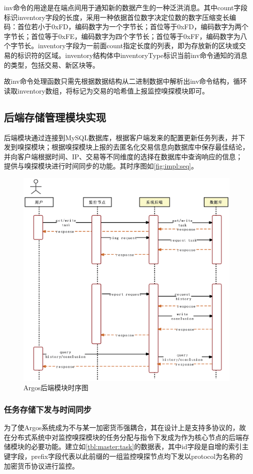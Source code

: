 \documentclass[supercite]{HustGraduPaper}
\newcommand{\xfig}[3]{
  \begin{figure}[htb]
    \centering
    #3
    \caption{#2}
    \label{fig:#1}
  \end{figure}
}
\newcommand{\rfig}[1]{\autoref{fig:#1}}
\newcommand{\rtbl}[1]{\autoref{tbl:#1}}
\theoremstyle{definition}
\begin{document}
inv命令的用途是在端点间用于通知新的数据产生的一种泛洪消息。其中count字段标识inventory字段的长度，采用一种依据首位数字决定位数的数字压缩变长编码：首位若小于0xFD，编码数字为一个字节长；首位等于0xFD，编码数字为两个字节长；首位等于0xFE，编码数字为四个字节长；首位等于0xFF，编码数字为八个字节长。inventory字段为一前面count指定长度的列表，即为存放新的区块或交易的标识符的区域。inventory结构体中inventoryType标识当前inv命令通知的消息的类型，包括交易、新区块等。

故inv命令处理函数只需先根据数据结构从二进制数据中解析出inv命令结构，循环读取inventory数组，将标记为交易的哈希值上报监控嗅探模块即可。

\subsection{后端存储管理模块实现}
后端模块通过连接到MySQL数据库，根据客户端发来的配置更新任务列表，并下发到嗅探模块；根据嗅探模块上报的去匿名化交易信息向数据库中保存最佳结论，并向客户端根据时间、IP、交易等不同维度的选择在数据库中查询响应的信息；提供与嗅探模块进行时间同步的功能。其时序图如\rfig{impl:seq}。

\xfig{impl:seq}{Argos后端模块时序图}{
  \includegraphics[width=\textwidth]{images/4.2-seq.ps}
}
\subsubsection{任务存储下发与时间同步}
为了使Argos系统成为不与某一加密货币强耦合，其在设计上是支持多协议的，故在分布式系统中对监控嗅探模块的任务分配与指令下发成为作为核心节点的后端存储模块的必要功能。建立如\rtbl{master:task}的数据表，其中id字段是自增的索引主键字段，prefix字段代表以此前缀的一组监控嗅探节点均下发以protocol为名称的加密货币协议进行监控。
\end{document}
